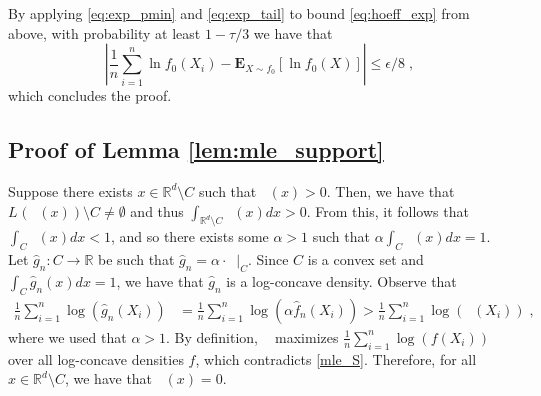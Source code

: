 \documentclass[final,12pt]{colt2018}
\newtheorem{informal theorem}[theorem]{Theorem (informal statement)}
\newcommand{\R}{\mathbb{R}}
\newcommand{\E}{\mathbf{E}}
\newcommand{\eps}{\epsilon}
\newcommand{\mle}{\mathop{\hat{f}_n}}
\begin{document}
By applying \eqref{eq:exp_pmin} and \eqref{eq:exp_tail} to bound \eqref{eq:hoeff_exp} from above, 
with probability at least $1-\tau/3$ we have  
that $$\left|\frac{1}{n} { \sum_{i=1}^n } \ln f_0(X_i) - {\E}_{X\sim f_0}\left[\ln f_0(X)\right]\right| \leq \eps/8 \;,$$
which concludes the proof.

\subsection{ {Proof of Lemma \ref{lem:mle_support}}}
Suppose there exists $x \in \mathbb{R}^d \setminus C$ such that $\mle(x) > 0$.
Then, we have that $L_{\mle}(\mle(x)) \setminus C \neq \emptyset$ and thus 
$\int_{\mathbb{R}^d \setminus C} \mle(x) dx > 0$.
From this, it follows that
$\int_{{C}} \mle(x) dx < 1$,
and so there exists some $\alpha > 1$ 
such that $\alpha \int_{{C}} \mle(x) dx = 1$.
{Let $\hat{g}_n : C \rightarrow \R$ be such that $\hat{g}_n = \alpha \cdot \mle |_C$}.
Since $C$ is a convex set and $\int_{C} \hat{g}_n(x) dx = 1$, we have that $\hat{g}_n$ is a log-concave density.
Observe that
\begin{align}
\frac{1}{n} { \sum_{i=1}^n } \log(\hat{g}_n(X_i)) &= \frac{1}{n} { \sum_{i=1}^n } \log(\alpha \hat{f}_n (X_i)) 
> \frac{1}{n} { \sum_{i=1}^n } \log(\mle (X_i)) \;, \label{mle_S}
\end{align}
where we used that $\alpha>1$.
By definition, $\mle$ maximizes $\frac{1}{n} { \sum_{i=1}^n } \log(f(X_i))$ 
over all log-concave densities $f$, which contradicts \eqref{mle_S}.
Therefore, for all $x \in \mathbb{R}^d \setminus C$, we have that $\mle(x) = 0$.
\end{document}
